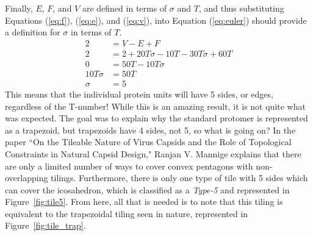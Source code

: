 \documentclass[12pt,letter]{article}
\begin{document}
Finally, $E$, $F$, and $V$ are defined in terms of $\sigma$ and $T$, and thus substituting Equations (\ref{eq:f}), (\ref{eq:e}), and (\ref{eq:v}), into Equation (\ref{eq:euler}) should provide a definition for $\sigma$ in terms of $T$.
\begin{align*}
	2 & = V - E + F\\
	2 &= 2 + 20T\sigma - 10T - 30 T \sigma + 60 T \\
	0 &= 50T - 10T\sigma \\
	10T\sigma &= 50T \\
	\sigma &= 5
\end{align*}
%
This means that the individual protein units will have 5 sides, or edges, regardless of the T-number! While this is an amazing result, it is not quite what was expected. The goal was to explain why the standard protomer is represented as a trapezoid, but trapezoids have 4 sides, not 5, so what is going on? In the paper ``On the Tileable Nature of Virus Capsids and the Role of Topological Constraints in Natural Capsid Design," Ranjan V. Mannige explains that there are only a limited number of ways to cover convex pentagons with non-overlapping tilings. Furthermore, there is only one type of tile with 5 sides which can cover the icosahedron, which is classified as a \textit{Type-5} and represented in Figure~\ref{fig:tile5}. From here, all that is needed is to note that this tiling is equivalent to the trapezoidal tiling seen in nature, represented in Figure~\ref{fig:tile_trap}. 
\end{document}
